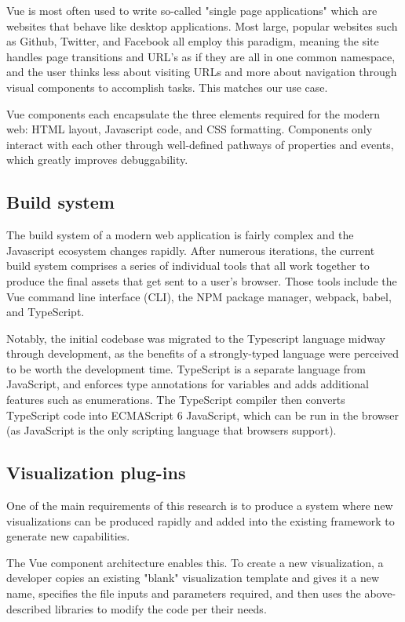 \documentclass[Afour,sagev,times]{sagej}
\begin{document}
Vue is most often used to write so-called "single page applications" which are websites that behave like desktop applications. Most large, popular websites such as Github, Twitter, and Facebook all employ this paradigm, meaning the site handles page transitions and URL's as if they are all in one common namespace, and the user thinks less about visiting URLs and more about navigation through visual components to accomplish tasks. This matches our use case.

Vue components each encapsulate the three elements required for the modern web: HTML layout, Javascript code, and CSS formatting. Components only interact with each other through well-defined pathways of properties and events, which greatly improves debuggability.

\subsection{Build system}

The build system of a modern web application is fairly complex and the Javascript ecosystem changes rapidly. After numerous iterations, the current build system comprises a series of individual tools that all work together to produce the final assets that get sent to a user's browser. Those tools include the Vue command line interface (CLI), the NPM package manager, webpack, babel, and TypeScript.

Notably, the initial codebase was migrated to the Typescript language midway through development, as the benefits of a strongly-typed language were perceived to be worth the development time. TypeScript is a separate language from JavaScript, and enforces type annotations for variables and adds additional features such as enumerations. The TypeScript compiler then converts TypeScript code into ECMAScript 6 JavaScript, which can be run in the browser (as JavaScript is the only scripting language that browsers support).

\subsection{Visualization plug-ins}

One of the main requirements of this research is to produce a system where new visualizations can be produced rapidly and added into the existing framework to generate new capabilities.

The Vue component architecture enables this. To create a new visualization, a developer copies an existing "blank" visualization template and gives it a new name, specifies the file inputs and parameters required, and then uses the above-described libraries to modify the code per their needs.
\end{document}

